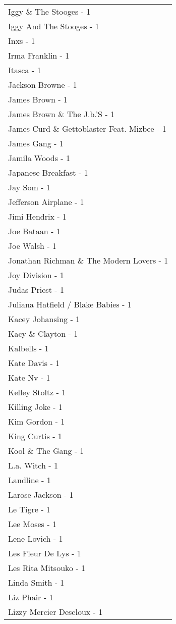 \documentclass[
]{article}
\begin{document}
\begin{longtable}{l}
Iggy \& The Stooges - 1 \\ 
Iggy And The Stooges - 1 \\ 
Inxs - 1 \\ 
Irma Franklin - 1 \\ 
Itasca - 1 \\ 
Jackson Browne - 1 \\ 
James Brown - 1 \\ 
James Brown \& The J.b.'S - 1 \\ 
James Curd \& Gettoblaster Feat. Mizbee - 1 \\ 
James Gang - 1 \\ 
Jamila Woods - 1 \\ 
Japanese Breakfast - 1 \\ 
Jay Som - 1 \\ 
Jefferson Airplane - 1 \\ 
Jimi Hendrix - 1 \\ 
Joe Bataan - 1 \\ 
Joe Walsh - 1 \\ 
Jonathan Richman \& The Modern Lovers - 1 \\ 
Joy Division - 1 \\ 
Judas Priest - 1 \\ 
Juliana Hatfield / Blake Babies - 1 \\ 
Kacey Johansing - 1 \\ 
Kacy \& Clayton - 1 \\ 
Kalbells - 1 \\ 
Kate Davis - 1 \\ 
Kate Nv - 1 \\ 
Kelley Stoltz - 1 \\ 
Killing Joke - 1 \\ 
Kim Gordon - 1 \\ 
King Curtis - 1 \\ 
Kool \& The Gang - 1 \\ 
L.a. Witch - 1 \\ 
Landline - 1 \\ 
Larose Jackson - 1 \\ 
Le Tigre - 1 \\ 
Lee Moses - 1 \\ 
Lene Lovich - 1 \\ 
Les Fleur De Lys - 1 \\ 
Les Rita Mitsouko - 1 \\ 
Linda Smith - 1 \\ 
Liz Phair - 1 \\ 
Lizzy Mercier Descloux - 1 \\ 

\end{longtable}
\end{document}
